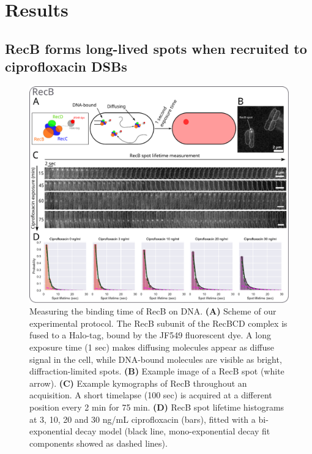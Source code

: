 \section*{Results}

\subsection*{RecB forms long-lived spots when recruited to cipro\-floxacin DSBs}

\begin{figure}[htbp]
    \centering
    \includegraphics[width=.8\textwidth]{Figures/Fig1_RecB_lifetime.pdf}
    \caption{Measuring the binding time of RecB on DNA. \textbf{(A)} Scheme of our experimental protocol. The RecB subunit of the RecBCD complex is fused to a Halo-tag, bound by the JF549 fluorescent dye. A long exposure time (1 sec) makes diffusing molecules appear as diffuse signal in the cell, while DNA-bound molecules are visible as bright, diffraction-limited spots. \textbf{(B)} Example image of a RecB spot (white arrow). \textbf{(C)} Example kymographs of RecB throughout an acquisition. A short timelapse (100 sec) is acquired at a different position every 2 min for 75 min. \textbf{(D)} RecB spot lifetime histograms at 3, 10, 20 and 30 ng/mL ciprofloxacin (bars), fitted with a bi-exponential decay model (black line, mono-exponential decay fit components showed as dashed lines).}
    \label{Fig:lifetimes}
\end{figure}

